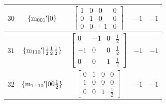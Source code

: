 \documentclass[fleqn,8pt]{jsarticle}
\begin{document}
\begin{longtable}{ccccc}
$ 30 $ & $ \{{\rm m}_{001}{}'|0\} $ & $ \begin{bmatrix} 1 & 0 & 0 & 0 \\ 0 & 1 & 0 & 0 \\ 0 & 0 & -1 & 0 \end{bmatrix} $ & $ -1 $ & $ -1 $ \\ \hline
$ 31 $ & $ \{{\rm m}_{110}{}'|\frac{1}{2} \frac{1}{2} \frac{1}{2}\} $ & $ \begin{bmatrix} 0 & -1 & 0 & \frac{1}{2} \\ -1 & 0 & 0 & \frac{1}{2} \\ 0 & 0 & 1 & \frac{1}{2} \end{bmatrix} $ & $ -1 $ & $ -1 $ \\ \hline
$ 32 $ & $ \{{\rm m}_{1-10}{}'|0 0 \frac{1}{2}\} $ & $ \begin{bmatrix} 0 & 1 & 0 & 0 \\ 1 & 0 & 0 & 0 \\ 0 & 0 & 1 & \frac{1}{2} \end{bmatrix} $ & $ -1 $ & $ -1 $ \\
\end{longtable}
\end{document}
